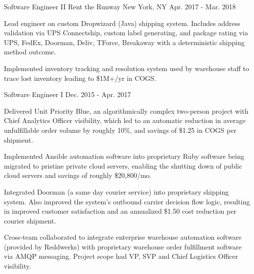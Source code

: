 
\begin{cventries}


  \cventry
    {Software Engineer II} %
    {Rent the Runway} %
    {New York, NY} %
    {Apr. 2017 - Mar. 2018} %
    {
      \begin{cvitems} %
        \item {Lead engineer on custom Dropwizard (Java) shipping system. Includes address validation via UPS Connectship, custom label generating, and package rating via UPS, FedEx, Doorman, Deliv, TForce, Breakaway with a deterministic shipping method outcome.} %
        \item {Implemented inventory tracking and resolution system used by warehouse staff to trace lost inventory leading to \$1M+/yr in COGS.}
      \end{cvitems}
    }

  \cventry
    {Software Engineer I} %
    {} %
    {} %
    {Dec. 2015 - Apr. 2017} %
    {
      \begin{cvitems} %
        \item {Delivered Unit Priority Blue, an algorithmically complex two-person project with Chief Analytics Officer visibility, which led to an automatic reduction in average unfulfillable order volume by roughly 10\%, and savings of \$1.25 in COGS per shipment.}
        \item {Implemented Ansible automation software into proprietary Ruby software being migrated to pristine private cloud servers, enabling the shutting down of public cloud servers and savings of roughly \$20,800/mo.}
        \item {Integrated Doorman (a same day courier service) into proprietary shipping system. Also improved the system's outbound carrier decision flow logic, resulting in improved customer satisfaction and an annualized \$1.50 cost reduction per courier shipment.}
        \item {Cross-team collaborated to integrate enterprise warehouse automation software (provided by Reddwerks) with proprietary warehouse order fulfillment software via AMQP messaging. Project scope had VP, SVP and Chief Logistics Officer visibility.}
      \end{cvitems}
    }


\end{cventries}
